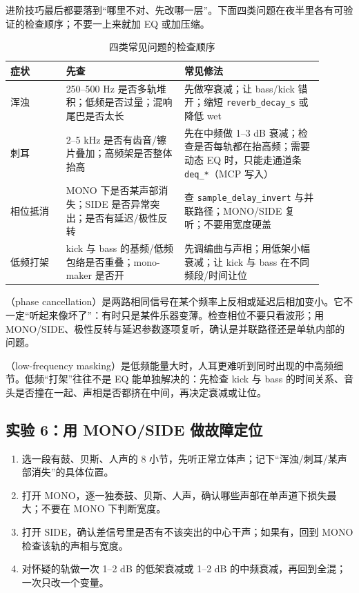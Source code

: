 进阶技巧最后都要落到“哪里不对、先改哪一层”。下面四类问题在夜半里各有可验证的检查顺序；不要一上来就加 EQ 或加压缩。

\begin{table}[htbp]
\centering
\small
\begin{tabular}{@{}p{0.16\linewidth}p{0.34\linewidth}p{0.40\linewidth}@{}}
\hline
症状 & 先查 & 常见修法 \\
\hline
浑浊 & 250–500 Hz 是否多轨堆积；低频是否过量；混响尾巴是否太长 & 先做窄衰减；让 bass/kick 错开；缩短 \texttt{reverb\_decay\_s} 或降低 wet \\
刺耳 & 2–5 kHz 是否有齿音/镲片叠加；高频架是否整体抬高 & 先在中频做 1–3 dB 衰减；检查是否每轨都在抬高频；需要动态 EQ 时，只能走通道条 \texttt{deq\_*}（MCP 写入） \\
相位抵消 & MONO 下是否某声部消失；SIDE 是否异常突出；是否有延迟/极性反转 & 查 \texttt{sample\_delay\_invert} 与并联路径；MONO/SIDE 复听；不要用宽度硬盖 \\
低频打架 & kick 与 bass 的基频/低频包络是否重叠；mono-maker 是否开 & 先调编曲与声相；用低架小幅衰减；让 kick 与 bass 在不同频段/时间让位 \\
\hline
\end{tabular}
\caption{四类常见问题的检查顺序}
\label{tab:advanced-troubleshooting}
\end{table}

（phase cancellation）是两路相同信号在某个频率上反相或延迟后相加变小。它不一定“听起来像坏了”：有时只是某件乐器变薄。检查相位不要只看波形；用 MONO/SIDE、极性反转与延迟参数逐项复听，确认是并联路径还是单轨内部的问题。

（low-frequency masking）是低频能量大时，人耳更难听到同时出现的中高频细节。低频“打架”往往不是 EQ 能单独解决的：先检查 kick 与 bass 的时间关系、音头是否撞在一起、声相是否都挤在中间，再决定衰减或让位。

\subsection{实验 6：用 MONO/SIDE 做故障定位}

\begin{enumerate}
  \item 选一段有鼓、贝斯、人声的 8 小节，先听正常立体声；记下“浑浊/刺耳/某声部消失”的具体位置。
  \item 打开 MONO，逐一独奏鼓、贝斯、人声，确认哪些声部在单声道下损失最大；不要在 MONO 下判断宽度。
  \item 打开 SIDE，确认差信号里是否有不该突出的中心干声；如果有，回到 MONO 检查该轨的声相与宽度。
  \item 对怀疑的轨做一次 1–2 dB 的低架衰减或 1–2 dB 的中频衰减，再回到全混；一次只改一个变量。
\end{enumerate}


